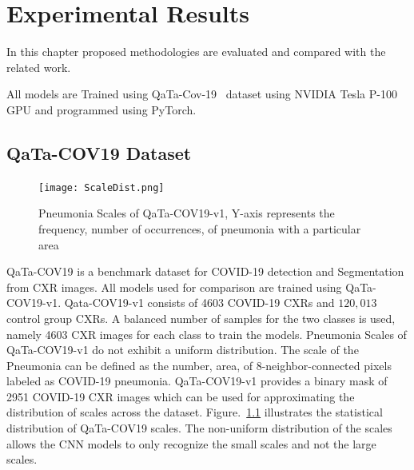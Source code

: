 
\chapter{Experimental Results} %

\label{chp:results} %
In this chapter proposed methodologies are evaluated and compared with the related work.

All models are Trained using QaTa-Cov-19~\cite{ahishali2021advance} dataset using NVIDIA Tesla P-100 GPU and programmed using PyTorch.
\section{QaTa-COV19 Dataset}
\begin{center}
\begin{figure}[htbp]
\centerline{\texttt{[image: ScaleDist.png]}}
\caption{Pneumonia Scales of QaTa-COV19-v1, Y-axis represents the frequency, number of occurrences, of pneumonia with a particular area}
\label{pdist}
\end{figure}
\end{center}
QaTa-COV19 is a benchmark dataset for COVID-19 detection and Segmentation from CXR images. All models used for comparison are trained using QaTa-COV19-v1. Qata-COV19-v1 consists of 4603 COVID-19 CXRs and $120,013$ control group CXRs. A balanced number of samples for the two classes is used, namely 4603 CXR images for each class to train the models. Pneumonia Scales of QaTa-COV19-v1 do not exhibit a uniform distribution. The scale of the Pneumonia can be defined as the number, area, of 8-neighbor-connected pixels labeled as COVID-19 pneumonia. QaTa-COV19-v1 provides a binary mask of 2951 COVID-19 CXR images which can be used for approximating the distribution of scales across the dataset. Figure.~\ref{pdist} illustrates the statistical distribution of QaTa-COV19 scales. The non-uniform distribution of the scales allows the CNN models to only recognize the small scales and not the large scales.

